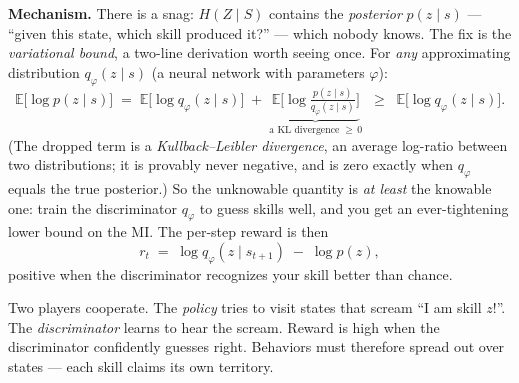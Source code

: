 \documentclass[11pt,a4paper]{article}
\begin{document}
\textbf{Mechanism.} There is a snag: $H(Z \mid S)$ contains the \emph{posterior}
$p(z \mid s)$ --- ``given this state, which skill produced it?'' --- which nobody
knows. The fix is the \emph{variational bound}, a two-line derivation worth
seeing once. For \emph{any} approximating distribution $q_\varphi(z \mid s)$
(a neural network with parameters $\varphi$):
\[
\mathbb{E}\big[\log p(z \mid s)\big]
\;=\; \mathbb{E}\big[\log q_\varphi(z \mid s)\big]
\;+\; \underbrace{\mathbb{E}\big[\log \tfrac{p(z \mid s)}{q_\varphi(z \mid s)}\big]}_{\text{a KL divergence } \ge\, 0}
\;\;\ge\;\; \mathbb{E}\big[\log q_\varphi(z \mid s)\big].
\]
(The dropped term is a \emph{Kullback--Leibler divergence}, an average
log-ratio between two distributions; it is provably never negative, and is zero
exactly when $q_\varphi$ equals the true posterior.) So the unknowable quantity
is \emph{at least} the knowable one: train the discriminator $q_\varphi$ to
guess skills well, and you get an ever-tightening lower bound on the MI.
The per-step reward is then
\[
r_t \;=\; \log q_\varphi(z \mid s_{t+1}) \;-\; \log p(z),
\]
positive when the discriminator recognizes your skill better than chance.
\begin{intuition}
Two players cooperate. The \emph{policy} tries to visit states that scream
``I am skill $z$!''. The \emph{discriminator} learns to hear the scream. Reward is
high when the discriminator confidently guesses right. Behaviors must therefore
spread out over states --- each skill claims its own territory.
\end{intuition}
\end{document}
